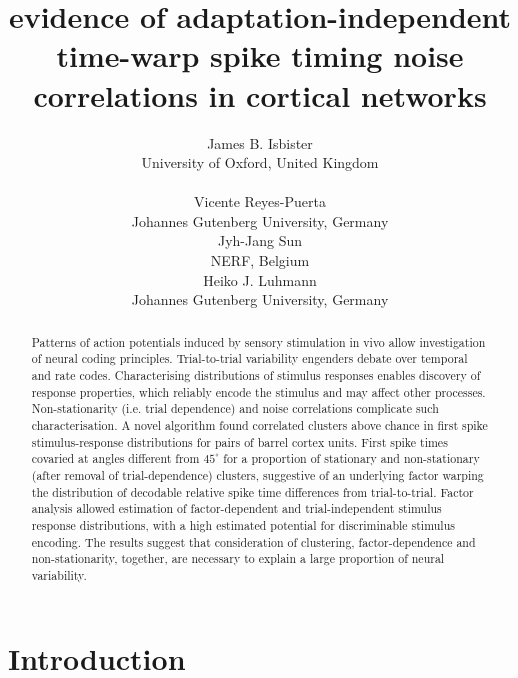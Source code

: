 \documentclass{article}
\title{evidence of adaptation-independent time-warp spike timing noise correlations in cortical networks}
\author{
  James B. Isbister\\
  University of Oxford, United Kingdom
  \And
              \\
              \\
  \And
  Vicente Reyes-Puerta\\
  Johannes Gutenberg University, Germany
  
  \And
  Jyh-Jang Sun\\
  NERF, Belgium

  \And
  Heiko J. Luhmann\\
  Johannes Gutenberg University, Germany


}
\begin{document}
\maketitle
 
\begin{abstract}



Patterns of action potentials induced by sensory stimulation in vivo allow investigation of neural coding principles. Trial-to-trial variability engenders debate over temporal and rate codes. Characterising distributions of stimulus responses enables discovery of response properties, which reliably encode the stimulus and may affect other processes. Non-stationarity (i.e. trial dependence) and noise correlations complicate such characterisation. A novel algorithm found correlated clusters above chance in first spike stimulus-response distributions for pairs of barrel cortex units. First spike times covaried at angles different from $45^{\circ}$ for a proportion of stationary and non-stationary (after removal of trial-dependence) clusters, suggestive of an underlying factor warping the distribution of decodable relative spike time differences from trial-to-trial. Factor analysis allowed estimation of factor-dependent and trial-independent stimulus response distributions, with a high estimated potential for discriminable stimulus encoding. The results suggest that consideration of clustering, factor-dependence and non-stationarity, together, are necessary to explain a large proportion of neural variability.


\end{abstract}




\section{Introduction}
\end{document}
